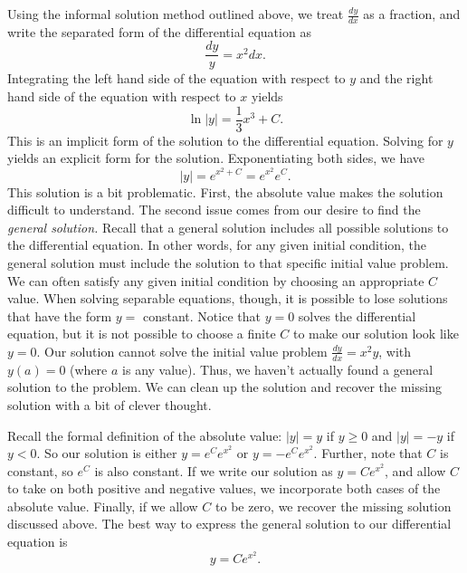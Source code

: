 {Using the informal solution method outlined above, we treat $\displaystyle \frac{dy}{dx}$ as a fraction, and write the separated form of the differential equation as
\[\frac{dy}{y} = x^2 dx.\]
Integrating the left hand side of the equation with respect to $y$ and the right hand side of the equation with respect to $x$ yields
\[\ln |y| = \frac{1}{3}x^3 + C.\]
This is an implicit form of the solution to the differential equation.  Solving for $y$ yields an explicit form for the solution.  Exponentiating both sides, we have
\[|y| = e^{x^2 + C} = e^{x^2}e^C.\]
This solution is a bit problematic. First, the absolute value makes the solution difficult to understand.  The second issue comes from our desire to find the \emph{general solution.}  Recall that a general solution includes all possible solutions to the differential equation.  In other words, for any given initial condition, the general solution must include the solution to that specific initial value problem.  We can often satisfy any given initial condition by choosing an appropriate $C$ value.  When solving separable equations, though, it is possible to lose solutions that have the form $y = $ constant.  Notice that $y=0$ solves the differential equation, but it is not possible to choose a finite $C$ to make our solution look like $y=0$.  Our solution cannot solve the initial value problem $\displaystyle \frac{dy}{dx} = x^2y$, with $y(a) = 0$ (where $a$ is any value).  Thus, we haven't actually found a general solution to the problem. We can clean up the solution and recover the missing solution with a bit of clever thought.

Recall the formal definition of the absolute value: $|y| = y$ if $y \geq 0$ and $|y| =  -y$ if $y < 0.$
So our solution is either $y = e^C e^{x^2}$ or $y = - e^C e^{x^2}$.  Further, note that $C$ is constant, so $e^C$ is also constant.  If we write our solution as $y = Ce^{x^2}$, and allow $C$ to take on both positive and negative values, we incorporate both cases of the absolute value. Finally, if we allow $C$ to be zero, we recover the missing solution discussed above.  The best way to express the general solution to our differential equation is
\[y = Ce^{x^2}.\]
}


